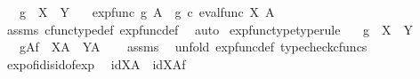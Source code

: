 \begin{isabellebody}
\ \ \ {\isachardoublequoteopen}g\ {\isacharcolon}{\kern0pt}\ X\ {\isasymrightarrow}\ Y{\isachardoublequoteclose}\isanewline
\ \ \ {\isachardoublequoteopen}exp{\isacharunderscore}{\kern0pt}func\ g\ A\ {\isacharequal}{\kern0pt}\ {\isacharparenleft}{\kern0pt}g\ {\isasymcirc}\isactrlsub c\ eval{\isacharunderscore}{\kern0pt}func\ X\ A{\isacharparenright}{\kern0pt}\isactrlsup {\isasymsharp}{\isachardoublequoteclose}\isanewline
%
\isadelimproof
\ \ %
\endisadelimproof
%
\isatagproof
{}\isamarkupfalse%
\ assms\ cfunc{\isacharunderscore}{\kern0pt}type{\isacharunderscore}{\kern0pt}def\ exp{\isacharunderscore}{\kern0pt}func{\isacharunderscore}{\kern0pt}def\ \isamarkupfalse%
\ auto%
\endisatagproof
{\isafoldproof}%
%
\isadelimproof
\isanewline
%
\endisadelimproof
\isanewline
{}\isamarkupfalse%
\ exp{\isacharunderscore}{\kern0pt}func{\isacharunderscore}{\kern0pt}type{\isacharbrackleft}{\kern0pt}type{\isacharunderscore}{\kern0pt}rule{\isacharbrackright}{\kern0pt}{\isacharcolon}{\kern0pt}\isanewline
\ \ \ {\isachardoublequoteopen}g\ {\isacharcolon}{\kern0pt}\ X\ {\isasymrightarrow}\ Y{\isachardoublequoteclose}\isanewline
\ \ \ {\isachardoublequoteopen}g\isactrlbsup A\isactrlesup \isactrlsub f\ {\isacharcolon}{\kern0pt}\ X\isactrlbsup A\isactrlesup \ {\isasymrightarrow}\ Y\isactrlbsup A\isactrlesup {\isachardoublequoteclose}\isanewline
%
\isadelimproof
\ \ %
\endisadelimproof
%
\isatagproof
{}\isamarkupfalse%
\ assms\ \isamarkupfalse%
\ {\isacharparenleft}{\kern0pt}unfold\ exp{\isacharunderscore}{\kern0pt}func{\isacharunderscore}{\kern0pt}def{}{\isacharcomma}{\kern0pt}\ typecheck{\isacharunderscore}{\kern0pt}cfuncs{\isacharparenright}{\kern0pt}%
\endisatagproof
{\isafoldproof}%
%
\isadelimproof
\isanewline
%
\endisadelimproof
\isanewline
{}\isamarkupfalse%
\ exp{\isacharunderscore}{\kern0pt}of{\isacharunderscore}{\kern0pt}id{\isacharunderscore}{\kern0pt}is{\isacharunderscore}{\kern0pt}id{\isacharunderscore}{\kern0pt}of{\isacharunderscore}{\kern0pt}exp{\isacharcolon}{\kern0pt}\isanewline
\ \ {\isachardoublequoteopen}id{\isacharparenleft}{\kern0pt}X\isactrlbsup A\isactrlesup {\isacharparenright}{\kern0pt}\ {\isacharequal}{\kern0pt}\ {\isacharparenleft}{\kern0pt}id{\isacharparenleft}{\kern0pt}X{\isacharparenright}{\kern0pt}{\isacharparenright}{\kern0pt}\isactrlbsup A\isactrlesup \isactrlsub f{\isachardoublequoteclose}\isanewline
%
\isadelimproof
\ \ %
\endisadelimproof
%
\isatagproof
{}\isamarkupfalse%

\end{isabellebody}
